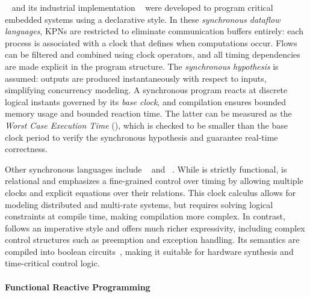 \Lustre~\cite{DBLP:conf/popl/CaspiPHP87} and its industrial implementation
\Scade~\cite{DBLP:conf/tase/ColacoPP17} were developed to program critical embedded systems using
a declarative style. In these \emph{synchronous dataflow languages}, KPNs are restricted
to eliminate communication buffers entirely: each process is associated with a clock that defines
when computations occur. Flows can be filtered and combined using clock operators, and all
timing dependencies are made explicit in the program structure. The \emph{synchronous hypothesis} is
assumed: outputs are produced instantaneously with respect to inputs, simplifying concurrency
modeling. A synchronous program reacts at discrete logical instants governed by its \emph
{base clock}, and compilation ensures bounded memory usage and bounded reaction time. The latter can
be measured as the \emph{Worst Case Execution Time} (\wcet), which is checked to be smaller than the
base clock period to verify the synchronous hypothesis and guarantee real-time correctness.

Other synchronous languages include \Signal~\cite{DBLP:journals/scp/BenvenisteGJ91} and
\Esterel~\cite{DBLP:journals/scp/BerryG92}. While \Lustre is strictly functional, \Signal is
relational and emphasizes a fine-grained control over timing by allowing multiple clocks and
explicit equations over their relations. This clock calculus allows for modeling distributed
and multi-rate systems, but requires solving logical constraints at compile time, making
compilation more complex. In contrast, \Esterel follows an imperative style and offers much richer
expressivity, including complex control structures such as preemption and exception handling.
Its semantics are compiled into boolean circuits~\cite{DBLP:books/daglib/0023221}, making it
suitable for hardware synthesis and time-critical control logic.

\paragraph{Functional Reactive Programming}
\label{sec:intro:dsl:dataflow:frp}

